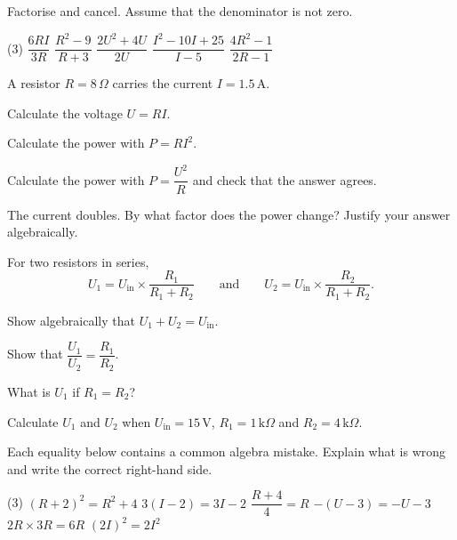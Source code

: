 Factorise and cancel. Assume that the denominator is not zero.
\begin{delar}(3)
  \task $\dfrac{6RI}{3R}$
  \task $\dfrac{R^2 - 9}{R + 3}$
  \task $\dfrac{2U^2 + 4U}{2U}$
  \task $\dfrac{I^2 - 10I + 25}{I - 5}$
  \task $\dfrac{4R^2 - 1}{2R - 1}$
\end{delar}

A resistor $R = 8\,\Omega$ carries the current $I = 1.5\,\text{A}$.
\begin{parts}
  \item Calculate the voltage $U = RI$.
  \item Calculate the power with $P = RI^2$.
  \item Calculate the power with $P = \dfrac{U^2}{R}$ and check that the answer agrees.
  \item The current doubles. By what factor does the power change? Justify your answer
    algebraically.
\end{parts}

For two resistors in series,
\[
  U_1 = U_{\text{in}} \times \frac{R_1}{R_1 + R_2}
  \qquad \text{and} \qquad
  U_2 = U_{\text{in}} \times \frac{R_2}{R_1 + R_2}.
\]
\begin{parts}
  \item Show algebraically that $U_1 + U_2 = U_{\text{in}}$.
  \item Show that $\dfrac{U_1}{U_2} = \dfrac{R_1}{R_2}$.
  \item What is $U_1$ if $R_1 = R_2$?
  \item Calculate $U_1$ and $U_2$ when $U_{\text{in}} = 15\,\text{V}$, $R_1 = 1\,\text{k}\Omega$ and
    $R_2 = 4\,\text{k}\Omega$.
\end{parts}

Each equality below contains a common algebra mistake. Explain what is wrong and write the correct
right-hand side.
\begin{delar}(3)
  \task $(R + 2)^2 = R^2 + 4$
  \task $3(I - 2) = 3I - 2$
  \task $\dfrac{R + 4}{4} = R$
  \task $-(U - 3) = -U - 3$
  \task $2R \times 3R = 6R$
  \task $(2I)^2 = 2I^2$
\end{delar}
